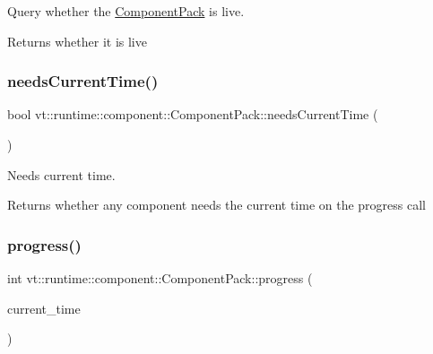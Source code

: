Query whether the {\ttfamily \hyperlink{structvt_1_1runtime_1_1component_1_1_component_pack}{Component\+Pack}} is live. 

\begin{DoxyReturn}{Returns}
whether it is live 
\end{DoxyReturn}
\mbox{\label{structvt_1_1runtime_1_1component_1_1_component_pack_aa220df4ce14324ef3580f309f5edd345}} 
\subsubsection{\texorpdfstring{needs\+Current\+Time()}{needsCurrentTime()}}
{\footnotesize\ttfamily bool vt\+::runtime\+::component\+::\+Component\+Pack\+::needs\+Current\+Time (\begin{DoxyParamCaption}{ }\end{DoxyParamCaption})}



Needs current time. 

\begin{DoxyReturn}{Returns}
whether any component needs the current time on the progress call 
\end{DoxyReturn}
\mbox{\label{structvt_1_1runtime_1_1component_1_1_component_pack_a618c94b245df9fa59979ecfb116866c2}} 
\subsubsection{\texorpdfstring{progress()}{progress()}}
{\footnotesize\ttfamily int vt\+::runtime\+::component\+::\+Component\+Pack\+::progress (\begin{DoxyParamCaption}\item[{\hyperlink{namespacevt_a876a9d0cd5a952859c72de8a46881442}{Time\+Type}}]{current\+\_\+time }\end{DoxyParamCaption})}



